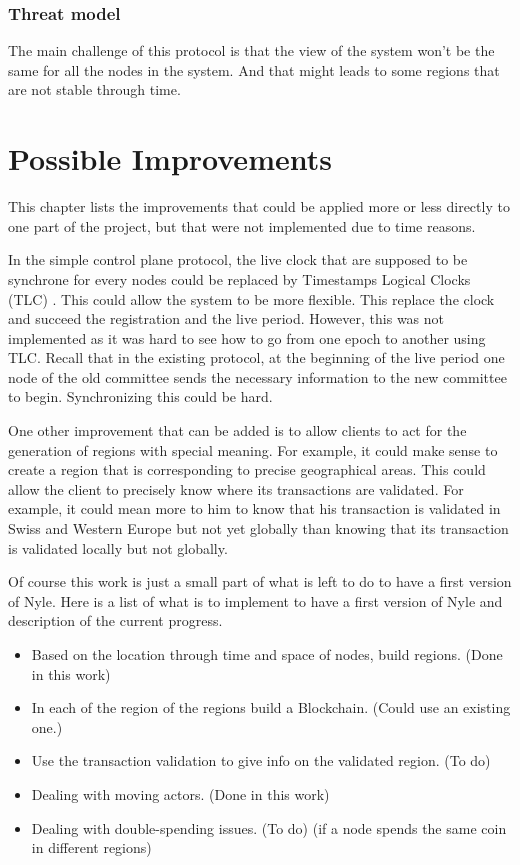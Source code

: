\documentclass[a4paper,11pt,oneside]{report}
\begin{document}
\subsection{Threat model}
The main challenge of this protocol is that the view of the system won't be the
same for all the nodes in the system. And that might leads to some regions that
are not stable through time. 


\chapter{Possible Improvements} \label{chap:Possible Improvements}

This chapter lists the improvements that could be applied more or less directly
to one part of the project, but that were not implemented due to time reasons. 

In the simple control plane protocol, the live clock that are supposed to be
synchrone for every nodes could be replaced by Timestamps Logical Clocks (TLC)
\cite{Ford2019}. This could allow the system to be more flexible.
This replace the clock and succeed the registration and the live period.
However, this was not implemented as it was hard to see how to go from one
epoch to another using TLC. Recall that in the existing protocol, at the
beginning of the live period one node of the old committee sends the necessary
information to the new committee to begin. Synchronizing this could be hard.

One other improvement that can be added is to allow clients to act for the
generation of regions with special meaning. For example, it could make sense to
create a region that is corresponding to precise geographical areas. This could
allow the client to precisely know where its transactions are validated. For
example, it could mean more to him to know that his transaction is validated in
Swiss and Western Europe but not yet globally than knowing that its transaction
is validated locally but not globally. 

Of course this work is just a small part of what is left to do to have a first
version of Nyle. Here is a list of what is to implement to have a first version
of Nyle and description of the current progress.

\begin{itemize} 
\item Based on the location through time and space of nodes, build regions.
(Done in this work)
\item In each of the region of the regions build a Blockchain. (Could use an
    existing one.)
\item Use the transaction validation to give info on the validated region. (To
do) 
\item Dealing with moving actors. (Done in this work)
\item Dealing with double-spending issues. (To do)
(if a node spends the same coin in different regions) 
\end{itemize}
\end{document}
